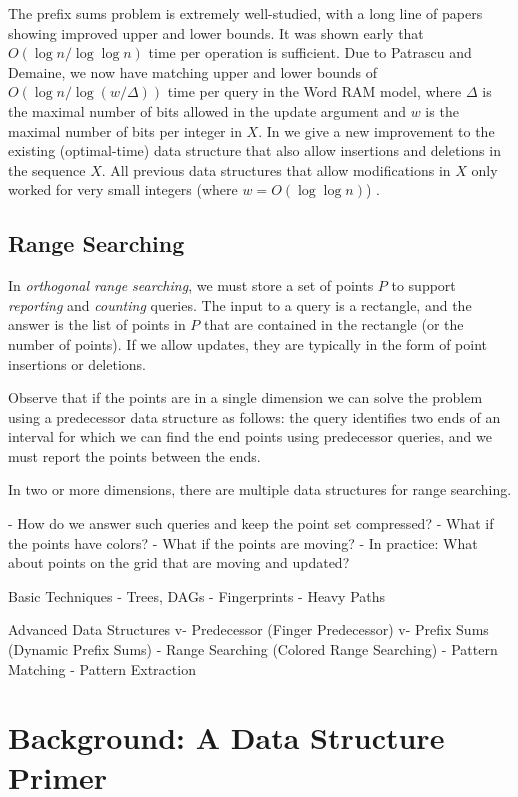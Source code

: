 The prefix sums problem is extremely well-studied, with a long line of papers showing improved upper and lower bounds. It was shown early that $O(\log n / \log \log n)$ time per operation is sufficient. Due to Patrascu and Demaine, we now have matching upper and lower bounds of $O(\log n / \log (w / \Delta))$  time per query in the Word RAM model, where $\Delta$ is the maximal number of bits allowed in the update argument and $w$ is the maximal number of bits per integer in $X$. In  we give a new improvement to the existing (optimal-time) data structure that also allow insertions and deletions in the sequence $X$. All previous data structures that allow modifications in $X$ only worked for very small integers (where $w = O(\log \log n)$) . 

\subsection{Range Searching}
In \emph{orthogonal range searching}, we must store a set of points $P$ to support \emph{reporting} and \emph{counting} queries. The input to a query is a rectangle, and the answer is the list of points in $P$ that are contained in the rectangle (or the number of points). If we allow updates, they are typically in the form of point insertions or deletions. 

Observe that if the points are in a single dimension we can solve the problem using a predecessor data structure as follows: the query identifies two ends of an interval for which we can find the end points using predecessor queries, and we must report the points between the ends.  

In two or more dimensions, there are multiple data structures for range searching. 

- How do we answer such queries and keep the point set compressed?
- What if the points have colors?
- What if the points are moving?
- In practice: What about points on the grid that are moving and updated?

Basic Techniques
- Trees, DAGs
- Fingerprints
- Heavy Paths

Advanced Data Structures
v- Predecessor (Finger Predecessor)
v- Prefix Sums (Dynamic Prefix Sums)
- Range Searching (Colored Range Searching)
- Pattern Matching
- Pattern Extraction



\section{Background: A Data Structure Primer}

